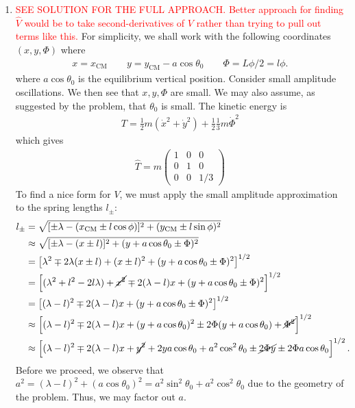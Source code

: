 \documentclass{article}
\theoremstyle{definition}
\newcommand{\f}[2]{\frac{#1}{#2}}
\newcommand{\lb}{\left[}
\newcommand{\rb}{\right]}
\begin{document}
\begin{enumerate}[label=(\alph*)]
	
	\item \textcolor{red}{SEE SOLUTION FOR THE FULL APPROACH. Better approach for finding $\hat V$ would be to take second-derivatives of $V$ rather than trying to pull out terms like this.} For simplicity, we shall work with the following coordinates $(x,y,\Phi)$ where 
	\begin{align*}
	x = x_\text{CM} \quad\quad y = y_\text{CM} - a\cos\theta_0 \quad\quad \Phi = L\phi/2 = l\phi.
	\end{align*}
	where $a\cos\theta_0$ is the equilibrium vertical position. Consider small amplitude oscillations. We then see that $x,y,\Phi$ are small.  We may also assume, as suggested by the problem, that $\theta_0$ is small. The kinetic energy is 
	\begin{align*}
	T = \f{1}{2}m (\dot{x}^2 + \dot{y}^2) + \f{1}{2}\f{1}{3}m\dot\Phi^2
	\end{align*}
	which gives
	\begin{align*}
	\boxed{\hat T = m\begin{pmatrix}
	1 & 0 & 0 \\
	0 & 1 & 0 \\
	0 & 0 & 1/3
	\end{pmatrix}}
	\end{align*}
	To find a nice form for $V$, we must apply the small amplitude approximation to the spring lengths $l_\pm$:
	\begin{align*}
	l_\pm  
	&= \sqrt{[\pm \lambda - (x_\text{CM} \pm l\cos\phi)]^2 + (y_\text{CM} \pm l\sin\phi)^2}\\
	&\approx \sqrt{[\pm \lambda - (x \pm l)]^2 + (y + a\cos\theta_0 \pm \Phi)^2}\\
	&= \lb \lambda^2 \mp 2\lambda(x\pm l)+(x\pm l)^2 + (y + a\cos\theta_0\pm \Phi)^2 \rb^{1/2}\\
	&= \lb (\lambda^2 + l^2 - 2l\lambda) + \cancel{x^2} \mp 2(\lambda-l) x + (y + a\cos\theta_0\pm \Phi)^2 \rb^{1/2}\\
	&= \lb (\lambda- l)^2 \mp 2(\lambda-l) x + (y + a\cos\theta_0\pm \Phi)^2 \rb^{1/2}\\
	&\approx \lb (\lambda- l)^2 \mp 2(\lambda-l) x
	+ (y+a\cos\theta_0)^2 \pm 2\Phi(y+a\cos\theta_0) + \cancel{\Phi^2} \rb^{1/2} \\
	&\approx \lb (\lambda- l)^2 \mp 2(\lambda-l) x  + \cancel{y^2} + 2ya\cos\theta_0 +a^2\cos^2\theta_0 \pm \cancel{2\Phi y} \pm 2\Phi a\cos\theta_0  \rb^{1/2}.
	\end{align*}
	Before we proceed, we observe that $a^2 = (\lambda-l)^2 + (a\cos\theta_0)^2 = a^2\sin^2\theta_0 + a^2\cos^2\theta_0 $ due to the geometry of the problem. Thus, we may factor out $a$. 

\end{enumerate}
\end{document}
